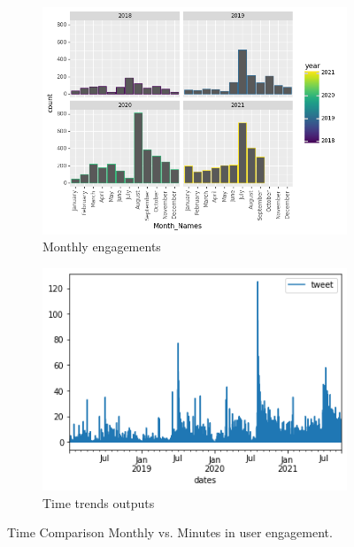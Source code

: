\begin{figure}
      \centering
	    \begin{subfigure}{0.3\linewidth}
		\includegraphics[width=\linewidth]{Users Month Names.png}
		\caption{Monthly engagements}
		\label{fig: Monthly Breakdown for engagement}
	   \end{subfigure}
	   \begin{subfigure}{0.3\linewidth}
		\includegraphics[width=\linewidth]{User 1 Minute Count.png}
		\caption{Time trends outputs}
		\label{fig:Breakdown of time trends by minute}
	    \end{subfigure}
	   \vfill
	 \caption{Time Comparison Monthly vs. Minutes in user engagement.}
\end{figure}

